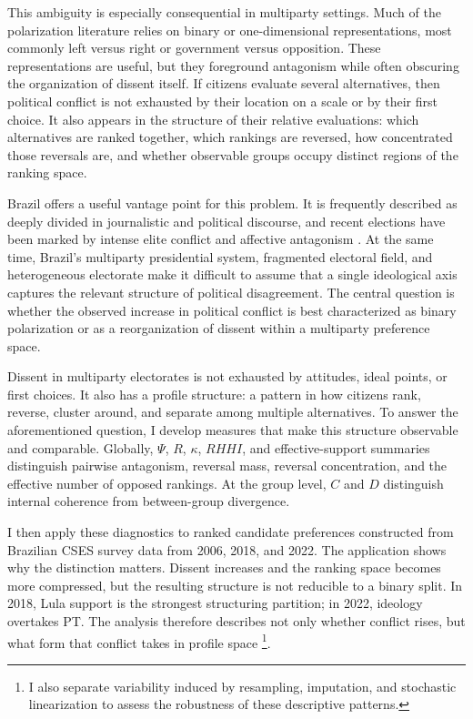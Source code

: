 \documentclass[12pt]{article}
\begin{document}
This ambiguity is especially consequential in multiparty settings. Much of the polarization literature relies on binary or one-dimensional representations, most commonly left versus right or government versus opposition. These representations are useful, but they foreground antagonism while often obscuring the organization of dissent itself. If citizens evaluate several alternatives, then political conflict is not exhausted by their location on a scale or by their first choice. It also appears in the structure of their relative evaluations: which alternatives are ranked together, which rankings are reversed, how concentrated those reversals are, and whether observable groups occupy distinct regions of the ranking space.

Brazil offers a useful vantage point for this problem. It is frequently described as deeply divided in journalistic and political discourse, and recent elections have been marked by intense elite conflict and affective antagonism \parencite{nunes2023biografia, samuels2018partisans}. At the same time, Brazil's multiparty presidential system, fragmented electoral field, and heterogeneous electorate make it difficult to assume that a single ideological axis captures the relevant structure of political disagreement. The central question is whether the observed increase in political conflict is best characterized as binary polarization or as a reorganization of dissent within a multiparty preference space.

 Dissent in multiparty electorates is not exhausted by attitudes, ideal points, or first choices. It also has a profile structure: a pattern in how citizens rank, reverse, cluster around, and separate among multiple alternatives. To answer the aforementioned question, I develop measures that make this structure observable and comparable. Globally, \(\Psi\), \(R\), \(\kappa\), \(RHHI\), and effective-support summaries distinguish pairwise antagonism, reversal mass, reversal concentration, and the effective number of opposed rankings. At the group level, \(C\) and \(D\) distinguish internal coherence from between-group divergence.

I then apply these diagnostics to ranked candidate preferences constructed from Brazilian CSES survey data from 2006, 2018, and 2022. The application shows why the distinction matters. Dissent increases and the ranking space becomes more compressed, but the resulting structure is not reducible to a binary split. In 2018, Lula support is the strongest structuring partition; in 2022, ideology overtakes PT. The analysis therefore describes not only whether conflict rises, but what form that conflict takes in profile space \footnote{I also separate variability induced by resampling, imputation, and stochastic linearization to assess the robustness of these descriptive patterns.}.
\end{document}
